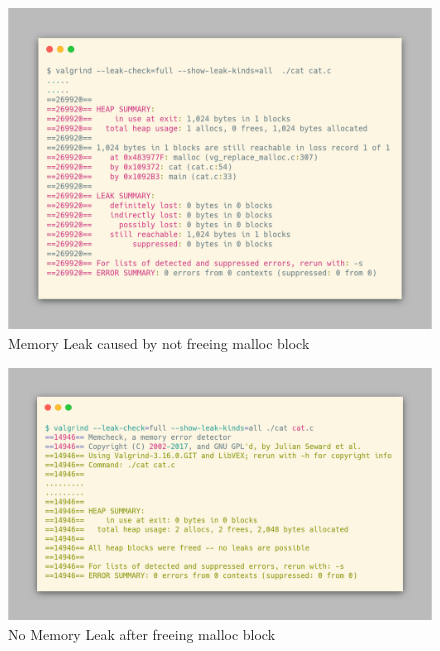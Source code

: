 \documentclass[12pt,a4paper,oneside]{report}
\begin{document}
\begin{figure}
\centering
        \includegraphics[totalheight=8cm]{../scrot/mem_leak}
    \caption{Memory Leak caused by not freeing malloc block}
    \label{fig:verticalcell}
\end{figure}

\begin{figure}
\centering
        \includegraphics[totalheight=8cm]{../scrot/fixed_mem_leak}
    \caption{No Memory Leak after freeing malloc block}
    \label{fig:verticalcell}
\end{figure}

        
\end{document}
